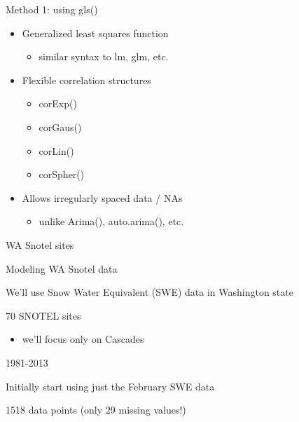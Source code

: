 \documentclass[
  ignorenonframetext,
]{beamer}
\providecommand{\tightlist}{%
  \setlength{\itemsep}{0pt}\setlength{\parskip}{0pt}}
\begin{document}
\begin{frame}{Method 1: using gls()}
\protect\hypertarget{method-1-using-gls}{}

\begin{itemize}
\tightlist
\item
  Generalized least squares function

  \begin{itemize}
  \tightlist
  \item
    similar syntax to lm, glm, etc.
  \end{itemize}
\item
  Flexible correlation structures

  \begin{itemize}
  \tightlist
  \item
    corExp()
  \item
    corGaus()
  \item
    corLin()
  \item
    corSpher()
  \end{itemize}
\item
  Allows irregularly spaced data / NAs

  \begin{itemize}
  \tightlist
  \item
    unlike Arima(), auto.arima(), etc.
  \end{itemize}
\end{itemize}

\end{frame}

\begin{frame}{WA Snotel sites}
\protect\hypertarget{wa-snotel-sites}{}

\end{frame}

\begin{frame}{Modeling WA Snotel data}
\protect\hypertarget{modeling-wa-snotel-data}{}

We'll use Snow Water Equivalent (SWE) data in Washington state

70 SNOTEL sites

\begin{itemize}
\tightlist
\item
  we'll focus only on Cascades
\end{itemize}

1981-2013

Initially start using just the February SWE data

1518 data points (only 29 missing values!)

\end{frame}
\end{document}
